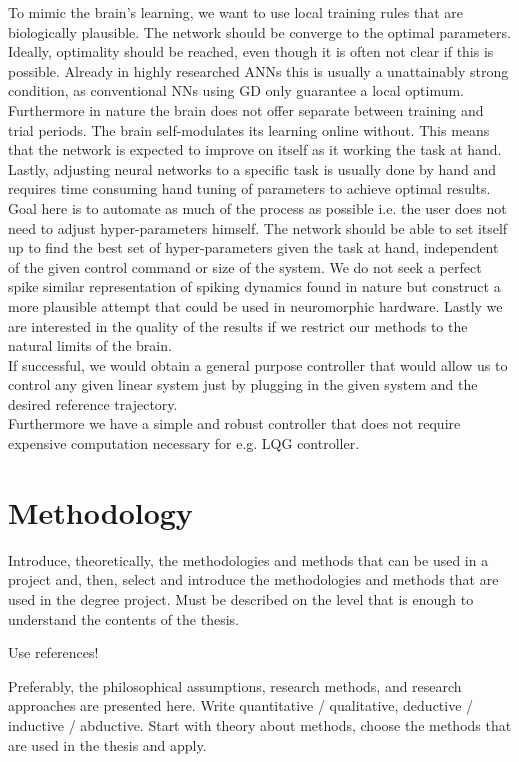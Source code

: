 To mimic the brain's learning, we want to use local training rules that are biologically plausible. The network should be converge to the optimal parameters.\\
Ideally, optimality should be reached, even though it is often not clear if this is possible. Already in highly researched \acp{ANN} this is usually a unattainably strong condition, as conventional \acp{NN} using \ac{GD} only guarantee a local optimum. \\
Furthermore in nature the brain does not offer separate between training and trial periods. The brain self-modulates its learning online without. This means that the network is expected to improve on itself as it working the task at hand.
Lastly, adjusting neural networks to a specific task is usually done by hand and requires time consuming hand tuning of parameters to achieve optimal results. Goal here is to automate as much of the process as possible i.e. the user does not need to adjust hyper-parameters himself. The network should be able to set itself up to find the best set of hyper-parameters given the task at hand, independent of the given control command or size of the system.
We do not seek a perfect spike similar representation of spiking dynamics found in nature but construct a more plausible attempt that could be used in neuromorphic hardware.
Lastly we are interested in the quality of the results if we restrict our methods to the natural limits of the brain.\\

If successful, we would obtain a general purpose controller that would allow us to control any given linear system just by plugging in the given system and the desired reference trajectory.\\
Furthermore we have a simple and robust controller that does not require expensive computation necessary for e.g. LQG controller.

\section{Methodology}
Introduce, theoretically, the methodologies and methods that can be used in a project and, then, select and introduce the methodologies and methods that are used in the degree project. Must be described on the level that is enough to understand the contents of the thesis.

Use references!

Preferably, the philosophical assumptions, research methods, and research approaches are presented here. Write quantitative / qualitative, deductive / inductive / abductive. Start with theory about methods, choose the methods that are used in the thesis and apply.


